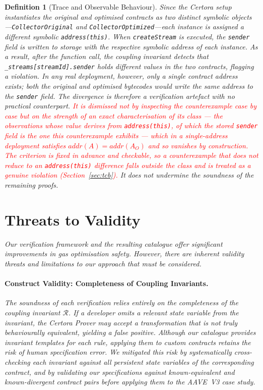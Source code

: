 \documentclass[manuscript,screen,review]{acmart}
\newcommand{\revised}[1]{\textcolor{red}{#1}}
\newtheorem{definition}{Definition}
\begin{document}
\begin{definition}[Trace and Observable Behaviour]
Since the Certora setup instantiates the original and optimised contracts
as two distinct symbolic objects---\texttt{CollectorOriginal} and
\texttt{CollectorOptimized}---each instance is assigned a different
symbolic \texttt{address(this)}. When \texttt{createStream} is executed,
the \texttt{sender} field is written to storage with the respective
symbolic address of each instance. As a result, after the function call,
the coupling invariant detects that \texttt{\_streams[streamId].sender}
holds different values in the two contracts, flagging a violation. In any
real deployment, however, only a single contract address exists; both the
original and optimised bytecodes would write the same address to the
\texttt{sender} field. The divergence is therefore a verification
artefact with no practical counterpart. \revised{It is dismissed not by
inspecting the counterexample case by case but on the strength of an exact
characterisation of its class --- the observations whose value derives from
\texttt{address(this)}, of which the stored \texttt{sender} field is the one this
counterexample exhibits --- which in a single-address deployment satisfies
$\mathit{addr}(A)\!=\!\mathit{addr}(A_O)$ and so vanishes by construction. The
criterion is fixed in advance and checkable, so a counterexample that does not
reduce to an \texttt{address(this)} difference falls outside the class and is
treated as a genuine violation (Section~\ref{sec:tcb}).} It does not undermine
the soundness of the remaining proofs.

\section{Threats to Validity}
\label{sec:threats_validity}

Our verification framework and the resulting catalogue offer significant improvements in gas optimisation safety. However, there are inherent validity threats and limitations to our approach that must be considered.

\paragraph{Construct Validity: Completeness of Coupling Invariants.}
The soundness of each verification relies entirely on the completeness
of the coupling invariant $\mathcal{R}$. If a developer omits a
relevant state variable from the invariant, the Certora Prover may
accept a transformation that is not truly behaviourally equivalent,
yielding a false positive. Although our catalogue provides invariant
templates for each rule, applying them to custom contracts retains the
risk of human specification error. We mitigated this risk by
systematically cross-checking each invariant against all persistent
state variables of the corresponding contract, and by validating
our specifications against known-equivalent and known-divergent
contract pairs before applying them to the AAVE~V3 case study.


\end{definition}
\end{document}
